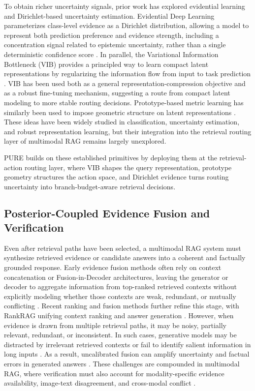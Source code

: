\documentclass[a4paper,fleqn]{cas-dc}
\begin{document}
To obtain richer uncertainty signals, prior work has explored evidential learning and Dirichlet-based uncertainty estimation. 
Evidential Deep Learning parameterizes class-level evidence as a Dirichlet distribution, allowing a model to represent both prediction preference and evidence strength, including a concentration signal related to epistemic uncertainty, rather than a single deterministic confidence score \citep{Sensoy2018Evidential,Malinin2018PriorNetworks}. 
In parallel, the Variational Information Bottleneck (VIB) provides a principled way to learn compact latent representations by regularizing the information flow from input to task prediction \citep{Alemi2017DeepVIB,Mahabadi2021VIBFineTuning}. 
VIB has been used both as a general representation-compression objective and as a robust fine-tuning mechanism, suggesting a route from compact latent modeling to more stable routing decisions. 
Prototype-based metric learning has similarly been used to impose geometric structure on latent representations \citep{Snell2017Prototypical}. 
These ideas have been widely studied in classification, uncertainty estimation, and robust representation learning, but their integration into the retrieval routing layer of multimodal RAG remains largely unexplored.

PURE builds on these established primitives by deploying them at the retrieval-action routing layer, where VIB shapes the query representation, prototype geometry structures the action space, and Dirichlet evidence turns routing uncertainty into branch-budget-aware retrieval decisions.

\subsection{Posterior-Coupled Evidence Fusion and Verification}
\label{subsec:posterior_fusion_verification}
Even after retrieval paths have been selected, a multimodal RAG system must synthesize retrieved evidence or candidate answers into a coherent and factually grounded response. 
Early evidence fusion methods often rely on context concatenation or Fusion-in-Decoder architectures, leaving the generator or decoder to aggregate information from top-ranked retrieved contexts without explicitly modeling whether those contexts are weak, redundant, or mutually conflicting \citep{Izacard2021Leveraging,Lewis2020RAG}. 
Recent ranking and fusion methods further refine this stage, with RankRAG unifying context ranking and answer generation \citep{Yue2024RankRAG}.
However, when evidence is drawn from multiple retrieval paths, it may be noisy, partially relevant, redundant, or inconsistent. 
In such cases, generative models may be distracted by irrelevant retrieved contexts or fail to identify salient information in long inputs \citep{Shi2023Distracted,Liu2024LostMiddle}. 
As a result, uncalibrated fusion can amplify uncertainty and factual errors in generated answers \citep{Kuhn2023Semantic,Ren2025FactualBoundary}. These challenges are compounded in multimodal RAG, where verification must also account for modality-specific evidence availability, image-text disagreement, and cross-modal conflict \citep{Chen2024Benchmarking,Yeo2026UniversalRAG}.
\end{document}
